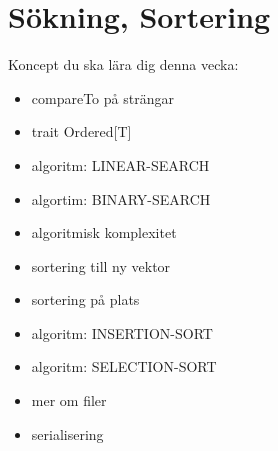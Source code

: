 \chapter{Sökning, Sortering}\label{chapter:W10}
Koncept du ska lära dig denna vecka:
\begin{multicols}{2}\begin{itemize}[nosep,label={$\square$},leftmargin=*]
\item compareTo på strängar
\item trait Ordered[T]
\item algoritm: LINEAR-SEARCH
\item algortim: BINARY-SEARCH
\item algoritmisk komplexitet
\item sortering till ny vektor
\item sortering på plats
\item algoritm: INSERTION-SORT
\item algoritm: SELECTION-SORT
\item mer om filer
\item serialisering\end{itemize}\end{multicols}
